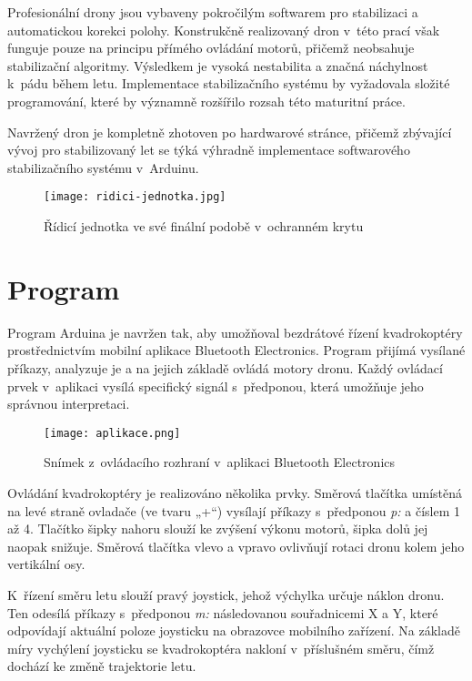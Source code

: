 \documentclass[12pt]{report}
\begin{document}
Profesionální drony jsou vybaveny pokročilým softwarem pro stabilizaci a automatickou korekci polohy. Konstrukčně realizovaný dron v~této prací však funguje pouze na principu přímého ovládání motorů, přičemž neobsahuje stabilizační algoritmy. Výsledkem je vysoká nestabilita a značná náchylnost k~pádu během letu. Implementace stabilizačního systému by vyžadovala složité programování, které by významně rozšířilo rozsah této maturitní práce.

Navržený dron je kompletně zhotoven po hardwarové stránce, přičemž zbývající vývoj pro stabilizovaný let se týká výhradně implementace softwarového stabilizačního systému v~Arduinu.

\begin{figure}[H]
	\centering
	\texttt{[image: ridici-jednotka.jpg]}
	\caption{Řídicí jednotka ve své finální podobě v~ochranném krytu}
	\label{fig:ridici-jednotka.jpg}
\end{figure}

\chapter[Program]{Program}
Program Arduina je navržen tak, aby umožňoval bezdrátové řízení kvadrokoptéry prostřednictvím mobilní aplikace Bluetooth Electronics. Program přijímá vysílané příkazy, analyzuje je a na jejich základě ovládá motory dronu. Každý ovládací prvek v~aplikaci vysílá specifický signál s~předponou, která umožňuje jeho správnou interpretaci.

\begin{figure}[H]
	\centering
	\texttt{[image: aplikace.png]}
	\caption{Snímek z~ovládacího rozhraní v~aplikaci Bluetooth Electronics}
	\label{fig:aplikace.png}
\end{figure}

Ovládání kvadrokoptéry je realizováno několika prvky. Směrová tlačítka umístěná na levé straně ovladače (ve tvaru „+“) vysílají příkazy s~předponou \textit{p:} a číslem 1 až 4. Tlačítko šipky nahoru slouží ke zvýšení výkonu motorů, šipka dolů jej naopak snižuje. Směrová tlačítka vlevo a vpravo ovlivňují rotaci dronu kolem jeho vertikální osy.

K~řízení směru letu slouží pravý joystick, jehož výchylka určuje náklon dronu. Ten odesílá příkazy s~předponou \textit{m:} následovanou souřadnicemi X a Y, které odpovídají aktuální poloze joysticku na obrazovce mobilního zařízení. Na základě míry vychýlení joysticku se kvadrokoptéra nakloní v~příslušném směru, čímž dochází ke změně trajektorie letu.
\end{document}
